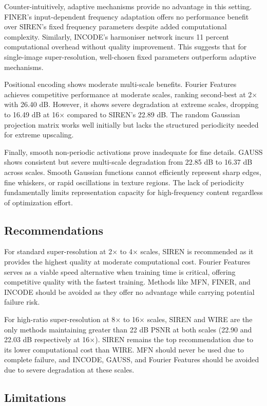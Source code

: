 \documentclass[a4paper,oneside,10pt,ngerman,english]{scrartcl}
\begin{document}
Counter-intuitively, adaptive mechanisms provide no advantage in this setting. FINER's input-dependent frequency adaptation offers no performance benefit over SIREN's fixed frequency parameters despite added computational complexity. Similarly, INCODE's harmoniser network incurs 11 percent computational overhead without quality improvement. This suggests that for single-image super-resolution, well-chosen fixed parameters outperform adaptive mechanisms.

Positional encoding shows moderate multi-scale benefits. Fourier Features achieves competitive performance at moderate scales, ranking second-best at 2$\times$ with 26.40 dB. However, it shows severe degradation at extreme scales, dropping to 16.49 dB at 16$\times$ compared to SIREN's 22.89 dB. The random Gaussian projection matrix works well initially but lacks the structured periodicity needed for extreme upscaling.

Finally, smooth non-periodic activations prove inadequate for fine details. GAUSS shows consistent but severe multi-scale degradation from 22.85 dB to 16.37 dB across scales. Smooth Gaussian functions cannot efficiently represent sharp edges, fine whiskers, or rapid oscillations in texture regions. The lack of periodicity fundamentally limits representation capacity for high-frequency content regardless of optimization effort.

\subsection{Recommendations}

For standard super-resolution at 2$\times$ to 4$\times$ scales, SIREN is recommended as it provides the highest quality at moderate computational cost. Fourier Features serves as a viable speed alternative when training time is critical, offering competitive quality with the fastest training. Methods like MFN, FINER, and INCODE should be avoided as they offer no advantage while carrying potential failure risk.

For high-ratio super-resolution at 8$\times$ to 16$\times$ scales, SIREN and WIRE are the only methods maintaining greater than 22 dB PSNR at both scales (22.90 and 22.03 dB respectively at 16$\times$). SIREN remains the top recommendation due to its lower computational cost than WIRE. MFN should never be used due to complete failure, and INCODE, GAUSS, and Fourier Features should be avoided due to severe degradation at these scales.

\subsection{Limitations}
\end{document}
